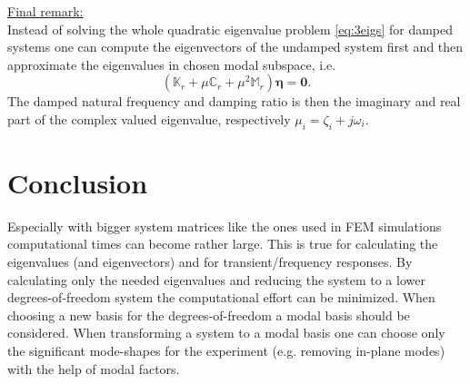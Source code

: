 \documentclass[conference]{journal}
\newcommand{\bb}[1]{\mathbb{#1}}
\newcommand{\B}[1]{\mathbf{#1}}
\newcommand{\Beta}{\boldsymbol{\eta}}
\newcommand{\M}{\bb{M}}
\newcommand{\C}{\bb{C}}
\newcommand{\K}{\bb{K}}
\begin{document}
	\underline{Final remark:}\\ Instead of solving the whole quadratic eigenvalue problem \eqref{eq:3eigs} for damped systems one can compute the eigenvectors of the undamped system first and then approximate the eigenvalues in chosen modal subspace, i.e.
	\begin{equation}
	(\K_r + \mu \C_r + \mu^2 \M_r) \Beta = \B{0}.
	\end{equation}  
	The damped natural frequency and damping ratio is then the imaginary and real part of the complex valued eigenvalue, respectively $\mu_i = \zeta_i + j \omega_i$.
	\section{Conclusion}
	Especially with bigger system matrices like the ones used in FEM simulations computational times can become rather large. This is true for calculating the eigenvalues (and eigenvectors) and for transient/frequency responses. By calculating only the needed eigenvalues and reducing the system to a lower degrees-of-freedom system the computational effort can be minimized. When choosing a new basis for the degrees-of-freedom a modal basis should be considered. When transforming a system to a modal basis one can choose only the significant mode-shapes for the experiment (e.g. removing in-plane modes) with the help of modal factors. 
	
	
\end{document}
